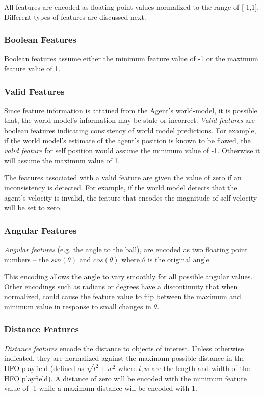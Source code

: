 \documentclass[12pt]{article}
\begin{document}
All features are encoded as floating point values normalized to the
range of [-1,1]. Different types of features are discussed next.

\subsubsection{Boolean Features}

Boolean features assume either the minimum feature value of -1 or the
maximum feature value of 1.

\subsubsection{Valid Features}

Since feature information is attained from the Agent's world-model, it
is possible that, the world model's information may be stale or
incorrect. \textit{Valid features} are boolean features indicating
consistency of world model predictions. For example, if the world
model's estimate of the agent's position is known to be flawed, the
\textit{valid feature} for self position would assume the minimum
value of -1. Otherwise it will assume the maximum value of 1.

The features associated with a valid feature are given the value of
zero if an inconsistency is detected. For example, if the world model
detects that the agent's velocity is invalid, the feature that encodes
the magnitude of self velocity will be set to zero.

\subsubsection{Angular Features}

\textit{Angular features} (e.g. the angle to the ball), are encoded as two
floating point numbers -- the $sin(\theta)$ and $cos(\theta)$ where
$\theta$ is the original angle.

This encoding allows the angle to vary smoothly for all possible
angular values. Other encodings such as radians or degrees have a
discontinuity that when normalized, could cause the feature value to
flip between the maximum and minimum value in response to small
changes in $\theta$.

\subsubsection{Distance Features}

\textit{Distance features} encode the distance to objects of
interest. Unless otherwise indicated, they are normalized against the
maximum possible distance in the HFO playfield (defined as $\sqrt{l^2
  + w^2}$ where $l,w$ are the length and width of the HFO
playfield). A distance of zero will be encoded with the minimum
feature value of -1 while a maximum distance will be encoded with 1.
\end{document}
